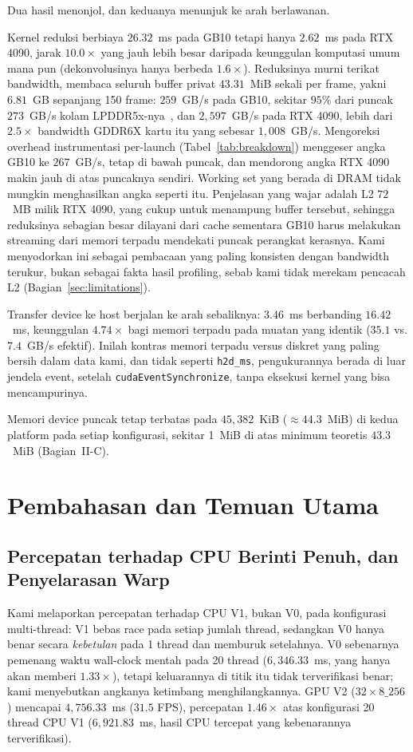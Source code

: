 \documentclass[conference]{IEEEtran}
\begin{document}
Dua hasil menonjol, dan keduanya menunjuk ke arah berlawanan.

Kernel reduksi berbiaya $26.32$~ms pada GB10 tetapi hanya $2.62$~ms pada RTX 4090, jarak $10.0\times$ yang jauh lebih besar daripada keunggulan komputasi umum mana pun (dekonvolusinya hanya berbeda $1.6\times$). Reduksinya murni terikat bandwidth, membaca seluruh buffer privat $43.31$~MiB sekali per frame, yakni $6.81$~GB sepanjang 150 frame: $259$~GB/s pada GB10, sekitar $95\%$ dari puncak $273$~GB/s kolam LPDDR5x-nya~\cite{asusgx10_datasheet}, dan $2{,}597$~GB/s pada RTX 4090, lebih dari $2.5\times$ bandwidth GDDR6X kartu itu yang sebesar $1{,}008$~GB/s. Mengoreksi overhead instrumentasi per-launch (Tabel~\ref{tab:breakdown}) menggeser angka GB10 ke $267$~GB/s, tetap di bawah puncak, dan mendorong angka RTX 4090 makin jauh di atas puncaknya sendiri. Working set yang berada di DRAM tidak mungkin menghasilkan angka seperti itu. Penjelasan yang wajar adalah L2 $72$~MB milik RTX 4090, yang cukup untuk menampung buffer tersebut, sehingga reduksinya sebagian besar dilayani dari cache sementara GB10 harus melakukan streaming dari memori terpadu mendekati puncak perangkat kerasnya. Kami menyodorkan ini sebagai pembacaan yang paling konsisten dengan bandwidth terukur, bukan sebagai fakta hasil profiling, sebab kami tidak merekam pencacah L2 (Bagian~\ref{sec:limitations}).

Transfer device ke host berjalan ke arah sebaliknya: $3.46$~ms berbanding $16.42$~ms, keunggulan $4.74\times$ bagi memori terpadu pada muatan yang identik ($35.1$ vs. $7.4$~GB/s efektif). Inilah kontras memori terpadu versus diskret yang paling bersih dalam data kami, dan tidak seperti \texttt{h2d\_ms}, pengukurannya berada di luar jendela event, setelah \texttt{cudaEventSynchronize}, tanpa eksekusi kernel yang bisa mencampurinya.

Memori device puncak tetap terbatas pada $45{,}382$~KiB ($\approx44.3$~MiB) di kedua platform pada setiap konfigurasi, sekitar 1~MiB di atas minimum teoretis $43.3$~MiB (Bagian~II-C).

\section{Pembahasan dan Temuan Utama}

\subsection{Percepatan terhadap CPU Berinti Penuh, dan Penyelarasan Warp}
\label{sec:gb10-speedup}
Kami melaporkan percepatan terhadap CPU V1, bukan V0, pada konfigurasi multi-thread: V1 bebas race pada setiap jumlah thread, sedangkan V0 hanya benar secara \emph{kebetulan} pada 1 thread dan memburuk setelahnya. V0 sebenarnya pemenang waktu wall-clock mentah pada 20 thread ($6{,}346.33$~ms, yang hanya akan memberi $1.33\times$), tetapi keluarannya di titik itu tidak terverifikasi benar; kami menyebutkan angkanya ketimbang menghilangkannya. GPU V2 ($32{\times}8\_256$) mencapai $4{,}756.33$~ms ($31.5$ FPS), percepatan $1.46\times$ atas konfigurasi 20 thread CPU V1 ($6{,}921.83$~ms, hasil CPU tercepat yang kebenarannya terverifikasi).
\end{document}
